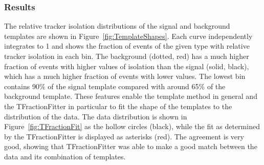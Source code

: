 \subsubsection{Results}
\label{anMeth:BGSubTemplateResults}


The relative tracker isolation distributions of the 
signal and background templates are shown in 
Figure~\ref{fig:TemplateShapes}.  
Each curve independently integrates to 1
and shows the fraction of events of the given type
with relative tracker isolation in each bin.
The background (dotted, red) has a much higher fraction of events 
with higher values of isolation 
than the signal (solid, black), 
which has a much higher fraction of events 
with lower values.  
The lowest bin contains 90\% of the signal template compared with 
around 65\% of the background template. 
These features enable the template method in general 
and the TFractionFitter in particular 
to fit the shape of the templates to the 
distribution of the data.  
The data distribution is shown in 
Figure~\ref{fig:TFractionFit} 
as the hollow circles (black), 
while the fit as determined by the
TFractionFitter is displayed as asterisks (red).  
The agreement is very good, showing that 
TFractionFitter was able to make a good 
match between the data and its combination 
of templates.  

